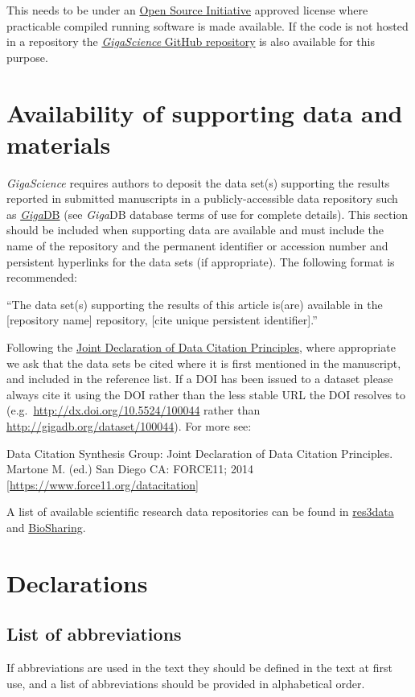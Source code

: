 \documentclass[a4paper,num-refs]{oup-contemporary}
\begin{document}
This needs to be under an \href{http:/opensource.org/licenses}{Open Source Initiative} approved license where practicable compiled running software is made available. If the code is not hosted in a repository the \href{https://github.com/gigascience}{\textit{GigaScience} GitHub repository} is also available for this purpose.

\section{Availability of supporting data and materials}

\textit{GigaScience} requires authors to deposit the data set(s) supporting the results reported in submitted manuscripts in a publicly-accessible data repository such as \href{http://gigadb.org/}{\textit{Giga}DB} (see \textit{Giga}DB database terms of use for complete details). This section should be included when supporting data are available and must include the name of the repository and the permanent identifier or accession number and persistent hyperlinks for the data sets (if appropriate). The following format is recommended:

``The data set(s) supporting the results of this article is(are) available in the [repository name] repository, [cite unique persistent identifier].''

Following the \href{https://www.force11.org/group/joint-declaration-data-citation-principles-final}{Joint Declaration of Data Citation Principles}, where appropriate we ask that the data sets be cited where it is first mentioned in the manuscript, and included in the reference list. If a DOI has been issued to a dataset please always cite it using the DOI rather than the less stable URL the DOI resolves to (e.g.~\url{http://dx.doi.org/10.5524/100044} rather than \url{http://gigadb.org/dataset/100044}). For more see:

Data Citation Synthesis Group: Joint Declaration of Data Citation Principles. Martone M. (ed.) San Diego CA: FORCE11; 2014 [\url{https://www.force11.org/datacitation}]

A list of available scientific research data repositories can be found in \href{http://www.re3data.org/}{res3data} and \href{https://biosharing.org/}{BioSharing}.

\section{Declarations}

\subsection{List of abbreviations}
If abbreviations are used in the text they should be defined in the text at first use, and a list of abbreviations should be provided in alphabetical order.
\end{document}
